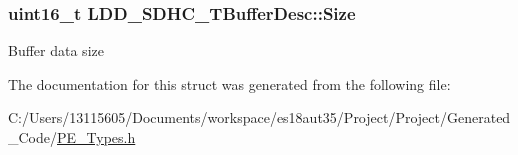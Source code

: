 \subsubsection[{Size}]{\setlength{\rightskip}{0pt plus 5cm}uint16\+\_\+t L\+D\+D\+\_\+\+S\+D\+H\+C\+\_\+\+T\+Buffer\+Desc\+::\+Size}\label{struct_l_d_d___s_d_h_c___t_buffer_desc_a117f5acff1ada72194a95b38795bca56}
Buffer data size 

The documentation for this struct was generated from the following file\+:\begin{DoxyCompactItemize}
\item 
C\+:/\+Users/13115605/\+Documents/workspace/es18aut35/\+Project/\+Project/\+Generated\+\_\+\+Code/\hyperlink{_p_e___types_8h}{P\+E\+\_\+\+Types.\+h}\end{DoxyCompactItemize}
